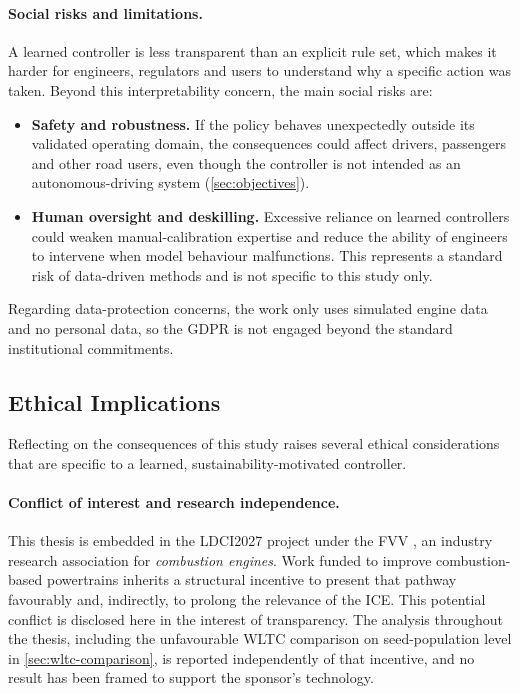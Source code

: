 \paragraph{Social risks and limitations.} A learned controller is less transparent than an explicit rule set, which makes it harder for engineers, regulators and users to understand why a specific action was taken. Beyond this interpretability concern, the main social risks are:

\begin{itemize}
  \item \textbf{Safety and robustness.} If the policy behaves unexpectedly outside its validated operating domain, the consequences could affect drivers, passengers and other road users, even though the controller is not intended as an autonomous-driving system (\autoref{sec:objectives}).
  \item \textbf{Human oversight and deskilling.} Excessive reliance on learned controllers could weaken manual-calibration expertise and reduce the ability of engineers to intervene when model behaviour malfunctions. This represents a standard risk of data-driven methods and is not specific to this study only.
\end{itemize}

Regarding data-protection concerns, the work only uses simulated engine data and no personal data, so the GDPR \cite{european_union_regulation_2016} is not engaged beyond the standard institutional commitments.

\subsection{Ethical Implications}
\label{subsec:ethics}

Reflecting on the consequences of this study raises several ethical considerations that are specific to a learned, sustainability-motivated controller.

\paragraph{Conflict of interest and research independence.} This thesis is embedded in the \ac{LDCI2027} project under the \ac{FVV} \cite{fvv_e_v_-_forschungsvereinigung_verbrennungskraftmaschinen_fvv_nodate}, an industry research association for \emph{combustion engines}. Work funded to improve combustion-based powertrains inherits a structural incentive to present that pathway favourably and, indirectly, to prolong the relevance of the \ac{ICE}. This potential conflict is disclosed here in the interest of transparency. The analysis throughout the thesis, including the unfavourable \ac{WLTC} comparison on seed-population level in \autoref{sec:wltc-comparison}, is reported independently of that incentive, and no result has been framed to support the sponsor's technology.

